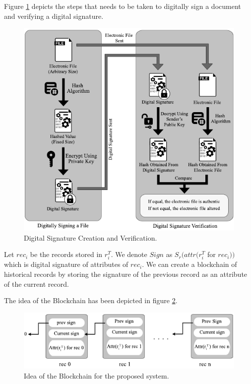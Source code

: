 Figure \ref{fig:DigitalSignature} depicts the steps that needs to be taken to digitally sign a document and verifying a digital signature.\\
\begin{figure}
	\centering
	\includegraphics[width=\textwidth]{figs/digital_signature.pdf}
	\caption{Digital Signature Creation and Verification.}
	\label{fig:DigitalSignature}
\end{figure}
\begin{defn}[Blockchain] 
	Let $rec_i$ be the records stored in $r_i^T$. We denote $Sign$ as $S_r(attr(r_i^T$ for $rec_i))$ which is digital signature of attributes of $rec_i$. We can create a blockchain of historical records by storing the signature of the previous record as an attribute of the current record.
\end{defn}
The idea of the Blockchain has been depicted in figure \ref{fig:Blockchain}.
\begin{figure}
	\centering
	\includegraphics[width=\textwidth]{figs/blockchain.pdf}
	\caption{Idea of the Blockchain for the proposed system.}
	\label{fig:Blockchain}
\end{figure}

